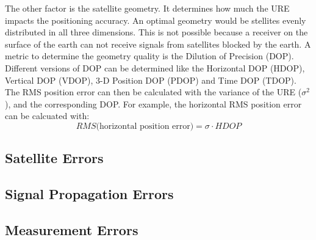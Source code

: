 The other factor is the satellite geometry.
It determines how much the URE impacts the positioning accuracy.
An optimal geometry would be stellites evenly distributed in all three dimensions.
This is not possible because a receiver on the surface of the earth can not receive signals from satellites blocked by the earth.
A metric to determine the geometry quality is the Dilution of Precision (DOP).
Different versions of DOP can be determined like the Horizontal DOP (HDOP), Vertical DOP (VDOP), 3-D Position DOP (PDOP) and Time DOP (TDOP).
The RMS position error can then be calculated with the variance of the URE ($\sigma^2$), and the corresponding DOP.
For example, the horizontal RMS position error can be calcuated with:
\begin{equation}
 RMS \text{(horizontal position error)} = \sigma \cdot HDOP
\end{equation}


\subsection{Satellite Errors}

\subsection{Signal Propagation Errors}

\subsection{Measurement Errors}

